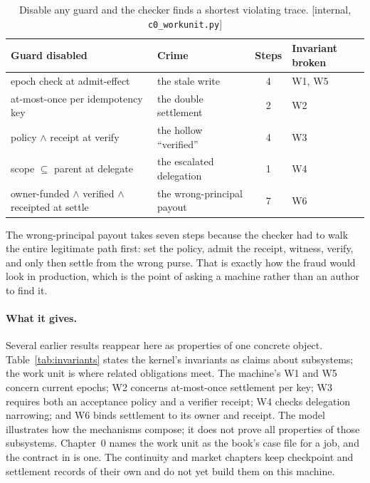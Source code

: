 \documentclass[11pt,a4paper]{article}
\theoremstyle{definition}
\theoremstyle{remark}
\begin{document}
\begin{table}[H]
\centering
\caption{Disable any guard and the checker finds a shortest violating trace.
[internal, \texttt{c0\_workunit.py}]}
\label{tab:workunit-crimes}
\small
\begin{tabularx}{\textwidth}{@{}>{\raggedright\arraybackslash}X >{\raggedright\arraybackslash}X cl@{}}
\toprule
\textbf{Guard disabled} & \textbf{Crime} & \textbf{Steps} & \textbf{Invariant broken} \\
\midrule
epoch check at admit-effect & the stale write & 4 & W1, W5 \\
at-most-once per idempotency key & the double settlement & 2 & W2 \\
policy $\wedge$ receipt at verify & the hollow ``verified'' & 4 & W3 \\
scope $\subseteq$ parent at delegate & the escalated delegation & 1 & W4 \\
owner-funded $\wedge$ verified $\wedge$ receipted at settle & the wrong-principal payout & 7 & W6 \\
\bottomrule
\end{tabularx}
\end{table}

The wrong-principal payout takes seven steps because the checker had to walk the
entire legitimate path first: set the policy, admit the receipt, witness, verify, and only
then settle from the wrong purse. That is exactly how the fraud would look in
production, which is the point of asking a machine rather than an author to find it.

\paragraph{What it gives.}
Several earlier results reappear here as properties of one concrete object.
Table~\ref{tab:invariants} states the kernel's invariants as claims about subsystems; the work
unit is where related obligations meet. The machine's W1 and W5 concern
current epochs; W2 concerns at-most-once settlement per key; W3 requires both
an acceptance policy and a verifier receipt; W4 checks delegation narrowing;
and W6 binds settlement to its owner and receipt.
The model illustrates how the mechanisms compose; it does not prove all
properties of those subsystems. Chapter~0 names the work unit as the book's case
file for a job, and the contract in  is one.
The continuity and market chapters keep checkpoint and settlement records of their
own and do not yet build them on this machine.
\end{document}

